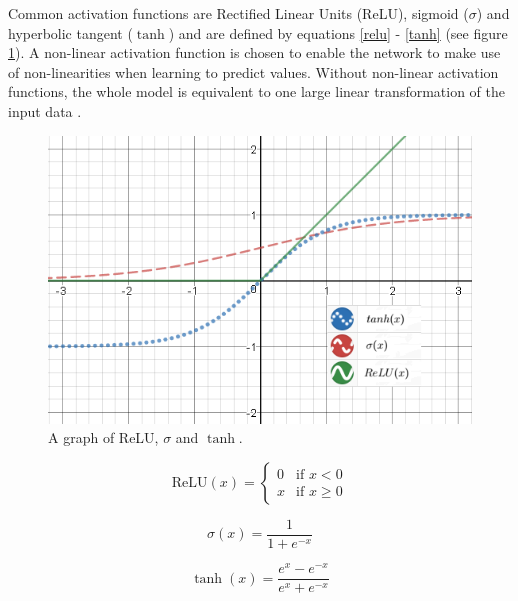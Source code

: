 \documentclass[a4paper, twoside]{article}
\begin{document}
Common activation functions are Rectified Linear Units (ReLU), sigmoid ($\sigma$) and hyperbolic tangent ($\tanh$) and are defined by equations \eqref{relu} - \eqref{tanh} (see figure \ref{activation_function}). A non-linear activation function is chosen to enable the network to make use of non-linearities when learning to predict values. Without non-linear activation functions, the whole model is equivalent to one large linear transformation of the input data \cite{cs231n}.
\\
\begin{figure}[h]
	\centering
  		\includegraphics[scale=0.73]{activationfunction.png}
  	\caption{A graph of ReLU, $\sigma$ and $\tanh$.} \label{activation_function}
\end{figure}

\begin{equation}\label{relu}
\mbox{ReLU}{(x)} = \begin{cases} 
			0 & \mbox{if } x < 0 \\ 
			x & \mbox{if } x \geq 0 
		\end{cases}
\end{equation}

\begin{equation}\label{sigmoid}
\sigma(x) = \frac{1}{1+e^{-x}}
\end{equation}

\begin{equation}\label{tanh}
\tanh{(x)} = \frac{e^x-e^{-x}}{e^x+e^{-x}}
\end{equation}
\end{document}
